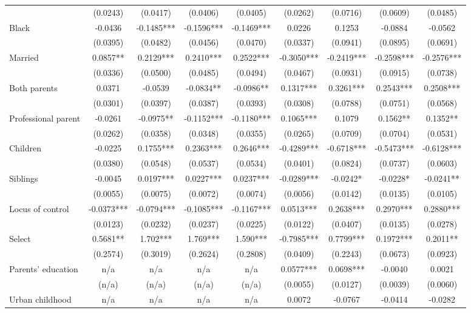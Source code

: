 \documentclass[12pt]{report}
\begin{document}
\begin{sidewaystable}
\begin{tabular}{lc|c|c|c|c|c|c|c}
& (0.0243) & (0.0417) & (0.0406) & (0.0405) & (0.0262) & (0.0716) & (0.0609) & (0.0485)\\
Black & -0.0436 & -0.1485*** & -0.1596*** & -0.1469*** & 0.0226 & 0.1253 & -0.0884 & -0.0562\\
& (0.0395) & (0.0482) & (0.0456) & (0.0470) & (0.0337) & (0.0941) & (0.0895) & (0.0691)\\
Married & 0.0857** & 0.2129*** & 0.2410*** & 0.2522*** & -0.3050*** & -0.2419*** & -0.2598*** & -0.2576***\\
& (0.0336) & (0.0500) & (0.0485) & (0.0494) & (0.0467) & (0.0931) & (0.0915) & (0.0738)\\
Both parents & 0.0371 & -0.0539 & -0.0834** & -0.0986** & 0.1317*** & 0.3261*** & 0.2543*** & 0.2508***\\
& (0.0301) & (0.0397) & (0.0387) & (0.0393) & (0.0308) & (0.0788) & (0.0751) & (0.0568)\\
Professional parent & -0.0261 & -0.0975** & -0.1152*** & -0.1180*** & 0.1065*** & 0.1079 & 0.1562** & 0.1352**\\
& (0.0262) & (0.0358) & (0.0348) & (0.0355) & (0.0265) & (0.0709) & (0.0704) & (0.0531)\\
Children & -0.0225 & 0.1755*** & 0.2363*** & 0.2646*** & -0.4289*** & -0.6718*** & -0.5473*** & -0.6128***\\
& (0.0380) & (0.0548) & (0.0537) & (0.0534) & (0.0401) & (0.0824) & (0.0737) & (0.0603)\\
Siblings & -0.0045 & 0.0197*** & 0.0227*** & 0.0237*** & -0.0289*** & -0.0242* & -0.0228* & -0.0241**\\
& (0.0055) & (0.0075) & (0.0072) & (0.0074) & (0.0056) & (0.0142) & (0.0135) & (0.0105)\\
Locus of control & -0.0373*** & -0.0794*** & -0.1085*** & -0.1167*** & 0.0513*** & 0.2638*** & 0.2970*** & 0.2880***\\
& (0.0123) & (0.0232) & (0.0237) & (0.0225) & (0.0122) & (0.0407) & (0.0135) & (0.0278)\\
Select & 0.5681** & 1.702*** & 1.769*** & 1.590*** & -0.7985*** & 0.7799*** & 0.1972*** & 0.2011**\\
& (0.2574) & (0.3019) & (0.2624) & (0.2808) & (0.0409) & (0.2243) & (0.0673) & (0.0923)\\
Parents' education & n/a & n/a & n/a & n/a & 0.0577*** & 0.0698*** & -0.0040 & 0.0021\\
& (n/a) & (n/a) & (n/a) & (n/a) & (0.0055) & (0.0127) & (0.0039) & (0.0060)\\
Urban childhood & n/a & n/a & n/a & n/a & 0.0072 & -0.0767 & -0.0414 & -0.0282\\

\end{tabular}
\end{sidewaystable}
\end{document}
